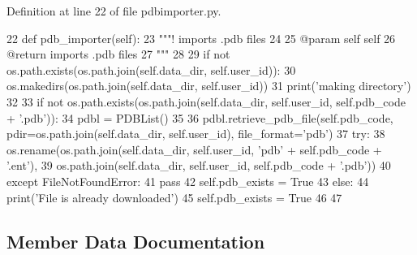 Definition at line 22 of file pdbimporter.\+py.


\begin{DoxyCode}
22     \textcolor{keyword}{def }pdb\_importer(self):
23         \textcolor{stringliteral}{"""! imports .pdb files}
24 \textcolor{stringliteral}{}
25 \textcolor{stringliteral}{        @param self self}
26 \textcolor{stringliteral}{        @return imports .pdb files}
27 \textcolor{stringliteral}{        """}
28 
29         \textcolor{keywordflow}{if} \textcolor{keywordflow}{not} os.path.exists(os.path.join(self.data\_dir, self.user\_id)):
30             os.makedirs(os.path.join(self.data\_dir, self.user\_id))
31             print(\textcolor{stringliteral}{'making directory'})
32 
33         \textcolor{keywordflow}{if} \textcolor{keywordflow}{not} os.path.exists(os.path.join(self.data\_dir, self.user\_id, self.pdb\_code + \textcolor{stringliteral}{'.pdb'})):
34             pdbl = PDBList()
35             
36             pdbl.retrieve\_pdb\_file(self.pdb\_code, pdir=os.path.join(self.data\_dir, self.user\_id), 
      file\_format=\textcolor{stringliteral}{'pdb'})
37             \textcolor{keywordflow}{try}:
38                 os.rename(os.path.join(self.data\_dir, self.user\_id, \textcolor{stringliteral}{'pdb'} + self.pdb\_code + \textcolor{stringliteral}{'.ent'}),
39                       os.path.join(self.data\_dir, self.user\_id, self.pdb\_code + \textcolor{stringliteral}{'.pdb'}))
40             \textcolor{keywordflow}{except} FileNotFoundError:
41                 \textcolor{keywordflow}{pass}
42             self.pdb\_exists = \textcolor{keyword}{True}
43         \textcolor{keywordflow}{else}:
44             print(\textcolor{stringliteral}{'File is already downloaded'})
45             self.pdb\_exists = \textcolor{keyword}{True}
46 
47 
\end{DoxyCode}


\subsection{Member Data Documentation}
\mbox{\label{classfragalysis__api_1_1xcimporter_1_1pdbimporter_1_1_import_pdb_a682ae0196455b3ba21d1f6f8083324ea}} 
